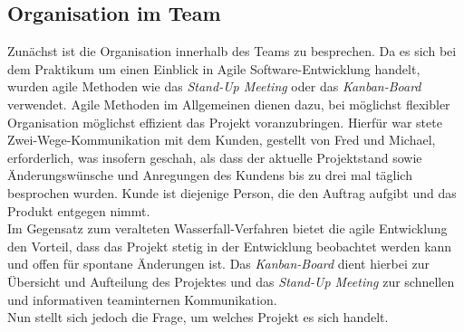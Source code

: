 \documentclass[12pt,twoside]{article}
\theoremstyle{plain}
\theoremstyle{definition}
\theoremstyle{remark}
\begin{document}
\subsection{Organisation im Team}
\label{orga}
Zunächst ist die Organisation innerhalb des Teams zu besprechen.
Da es sich bei dem Praktikum um einen Einblick in Agile Software-Entwicklung handelt, wurden agile Methoden wie das \textit{Stand-Up Meeting} oder das \textit{Kanban-Board} verwendet.
Agile Methoden im Allgemeinen dienen dazu, bei möglichst flexibler Organisation möglichst effizient das Projekt voranzubringen.
Hierfür war stete Zwei-Wege-Kommunikation mit dem Kunden, gestellt von Fred und Michael, erforderlich, was insofern geschah, als dass der aktuelle Projektstand sowie Änderungswünsche und Anregungen des Kundens bis zu drei mal täglich besprochen wurden.
Kunde ist diejenige Person, die den Auftrag aufgibt und das Produkt entgegen nimmt.\\
Im Gegensatz zum veralteten Wasserfall-Verfahren bietet die agile Entwicklung den Vorteil, dass das Projekt stetig in der Entwicklung beobachtet werden kann und offen für spontane Änderungen ist.
Das \textit{Kanban-Board} dient hierbei zur Übersicht und Aufteilung des Projektes und das \textit{Stand-Up Meeting} zur schnellen und informativen teaminternen Kommunikation.\\
Nun stellt sich jedoch die Frage, um welches Projekt es sich handelt.

%
%
\end{document}
